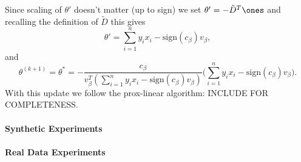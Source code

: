 \documentclass[12pt]{article}
\begin{document}
Since scaling of $\theta'$ doesn't matter (up to sign) we set $\theta' = -\tilde D^{T} \ones$ and recalling the definition of $\tilde D$ this gives
\begin{equation}
\theta' = \sum \limits_{i=1}^{n} y_{i}x_{i} - \textrm{sign}(c_{\beta})v_{\beta},
\end{equation}
and
\begin{equation}
\theta^{(k+1)} = \theta^{*} = -\frac{c_{\beta}}{v_{\beta}^{T}(\sum \limits_{i=1}^{n} y_{i}x_{i} - \textrm{sign}(c_{\beta})v_{\beta})} \bigg( \sum \limits_{i=1}^{n} y_{i}x_{i} - \textrm{sign}(c_{\beta})v_{\beta} \bigg).
\end{equation}
With this update we follow the prox-linear algorithm: INCLUDE FOR COMPLETENESS.

\paragraph{Synthetic Experiments}
\paragraph{Real Data Experiments}
  
\end{document}
